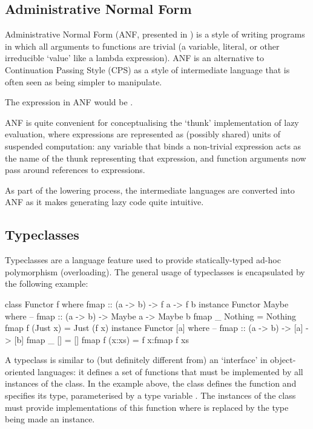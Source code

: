 \documentclass[dissertation.tex]{subfiles}
\begin{document}
{    \subsection{Administrative Normal Form}\label{sec:anf}
    {
        Administrative Normal Form (ANF, presented in \cite{ANF}) is a style of writing programs in which all arguments to functions are trivial (a variable, literal, or other irreducible `value' like a lambda expression). ANF is an alternative to Continuation Passing Style (CPS) as a style of intermediate language that is often seen as being simpler to manipulate.

        The expression  in ANF would be .

        ANF is quite convenient for conceptualising the `thunk' implementation of lazy evaluation, where expressions are represented as (possibly shared) units of suspended computation: any variable that binds a non-trivial expression acts as the name of the thunk representing that expression, and function arguments now pass around references to expressions. 

        As part of the lowering process, the intermediate languages are converted into ANF as it makes generating lazy code quite intuitive. 
    }
    \subsection{Typeclasses}\label{sec:typeclasses}
    {
        Typeclasses are a language feature used to provide statically-typed ad-hoc polymorphism (overloading). The general usage of typeclasses is encapsulated by the following example: 

        \begin{haskellfigure}
        class Functor f where
            fmap :: (a -> b) -> f a -> f b
        instance Functor Maybe where
            -- fmap :: (a -> b) -> Maybe a -> Maybe b
            fmap _ Nothing = Nothing
            fmap f (Just x) = Just (f x)
        instance Functor [a] where
            -- fmap :: (a -> b) -> [a] -> [b]
            fmap _ [] = []
            fmap f (x:xs) = f x:fmap f xs
        \end{haskellfigure}

        A typeclass is similar to (but definitely different from) an `interface' in object-oriented languages: it defines a set of functions that must be implemented by all instances of the class. In the example above, the  class defines the  function and specifies its type, parameterised by a type variable . The instances of the class must provide implementations of this function where  is replaced by the type being made an instance.

}}
\end{document}
